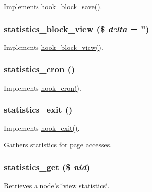 \label{statistics_8module_a1a71da55c633b8226c93ddb71fa8af5f}
Implements \hyperlink{group__hooks_ga622024ce4f818c241ca7a765e829f928}{hook\_\-block\_\-save()}. \hypertarget{statistics_8module_ab362991a11f282c0379b1e98124fa653}{
\subsubsection[{statistics\_\-block\_\-view}]{\setlength{\rightskip}{0pt plus 5cm}statistics\_\-block\_\-view (\$ {\em delta} = {\ttfamily ''})}}
\label{statistics_8module_ab362991a11f282c0379b1e98124fa653}
Implements \hyperlink{group__hooks_gaa14092a3e74cdc57aa295100cfd6860d}{hook\_\-block\_\-view()}. \hypertarget{statistics_8module_af9e6a4f423aee26c65a1d9acb69c3a96}{
\subsubsection[{statistics\_\-cron}]{\setlength{\rightskip}{0pt plus 5cm}statistics\_\-cron ()}}
\label{statistics_8module_af9e6a4f423aee26c65a1d9acb69c3a96}
Implements \hyperlink{group__hooks_gaf07f1e3d98112fc2ba6920cf7ee6fb16}{hook\_\-cron()}. \hypertarget{statistics_8module_a202ea07bc132a6ca79372feb436b3079}{
\subsubsection[{statistics\_\-exit}]{\setlength{\rightskip}{0pt plus 5cm}statistics\_\-exit ()}}
\label{statistics_8module_a202ea07bc132a6ca79372feb436b3079}
Implements \hyperlink{group__hooks_gaab945bbc2e651510aee460dcc8691366}{hook\_\-exit()}.

Gathers statistics for page accesses. \hypertarget{statistics_8module_a30aa1d647f1ff4c72d1ff5daf5af893b}{
\subsubsection[{statistics\_\-get}]{\setlength{\rightskip}{0pt plus 5cm}statistics\_\-get (\$ {\em nid})}}
\label{statistics_8module_a30aa1d647f1ff4c72d1ff5daf5af893b}
Retrieves a node's \char`\"{}view statistics\char`\"{}.


